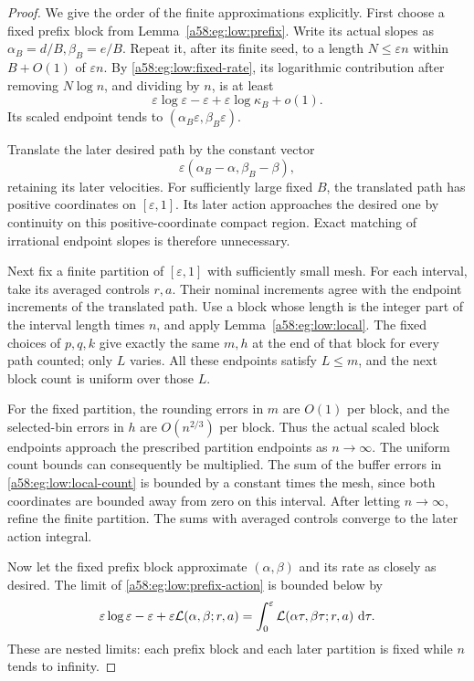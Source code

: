 \documentclass[11pt,letterpaper]{article}
\theoremstyle{remark}
\newcommand{\egdd}{\,\mathrm d}
\begin{document}
\begin{proof}
We give the order of the finite approximations explicitly.
First choose a fixed prefix block from Lemma~\ref{a58:eg:low:prefix}.
Write its actual slopes as \(\alpha_B=d/B,\beta_B=e/B\).
Repeat it, after its finite seed, to a length \(N\le\varepsilon n\)
within \(B+O(1)\) of \(\varepsilon n\).
By \eqref{a58:eg:low:fixed-rate}, its logarithmic contribution after removing
\(N\log n\), and dividing by \(n\), is at least
\begin{equation}\label{a58:eg:low:prefix-action}
 \varepsilon\log\varepsilon-\varepsilon
 +\varepsilon\log\kappa_B+o(1).
\end{equation}
Its scaled endpoint tends to
\((\alpha_B\varepsilon,\beta_B\varepsilon)\).

Translate the later desired path by the constant vector
\[
 \varepsilon(\alpha_B-\alpha,\beta_B-\beta),
\]
retaining its later velocities. For sufficiently large fixed \(B\),
the translated path has positive coordinates on \([\varepsilon,1]\).
Its later action approaches the desired one by continuity on this
positive-coordinate compact region. Exact matching of irrational
endpoint slopes is therefore unnecessary.

Next fix a finite partition of \([\varepsilon,1]\) with sufficiently
small mesh. For each interval, take its averaged controls \(r,a\).
Their nominal increments agree with the endpoint increments of the
translated path. Use a block whose length is the integer part of the
interval length times \(n\), and apply Lemma~\ref{a58:eg:low:local}.
The fixed choices of \(p,q,k\) give exactly the same \(m,h\) at the
end of that block for every path counted; only \(L\) varies.
All these endpoints satisfy \(L\le m\), and the next block count
is uniform over those \(L\).

For the fixed partition, the rounding errors in \(m\) are \(O(1)\)
per block, and the selected-bin errors in \(h\) are \(O(n^{2/3})\)
per block. Thus the actual scaled block endpoints approach the
prescribed partition endpoints as \(n\to\infty\).
The uniform count bounds can consequently be multiplied.
The sum of the buffer errors in \eqref{a58:eg:low:local-count} is bounded
by a constant times the mesh, since both coordinates are bounded
away from zero on this interval.
After letting \(n\to\infty\), refine the finite partition.
The sums with averaged controls converge to the later action integral.

Now let the fixed prefix block approximate \((\alpha,\beta)\) and its
rate as closely as desired. The limit of \eqref{a58:eg:low:prefix-action}
is bounded below by
\[
 \varepsilon\log\varepsilon-\varepsilon
 +\varepsilon{\cal L}(\alpha,\beta;r,a)
 =\int_0^\varepsilon
    {\cal L}(\alpha\tau,\beta\tau;r,a)\,\egdd\tau.
\]
These are nested limits: each prefix block and each later partition
is fixed while \(n\) tends to infinity.


\end{proof}
\end{document}

